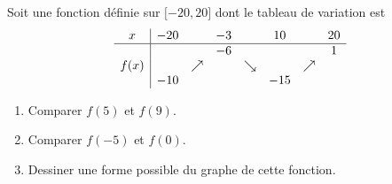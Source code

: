 
\begin{exercice}\label{exosmath-0209}

    Soit une fonction définie sur \( \mathopen[ -20 , 20 \mathclose]\) dont le tableau de variation est
\begin{equation*}
    \begin{array}[]{c|ccccccc}
        x&-20&&-3&&10&&20\\
        \hline
        &&&-6&&&&1\\
        f(x)&&\nearrow&&\searrow&&\nearrow\\
        &-10&&&&-15
    \end{array}
\end{equation*}
\begin{enumerate}
    \item
        Comparer \( f(5)\) et \( f(9)\).
    \item
        Comparer \( f(-5)\) et \( f(0)\).
    \item
        Dessiner une forme possible du graphe de cette fonction.
\end{enumerate}

\end{exercice}
